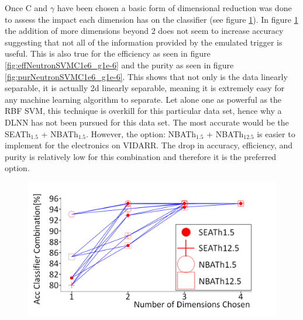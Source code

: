 Once C and $\gamma$ have been chosen a basic form of dimensional reduction was done to assess the impact each dimension has on the classifier (see figure \ref{fig:accNeutronSVMC1e6_g1e-6}). In figure \ref{fig:accNeutronSVMC1e6_g1e-6} the addition of more dimensions beyond 2 does not seem to increase accuracy suggesting that not all of the information provided by the emulated trigger is useful. This is also true for the efficiency as seen in figure \ref{fig:effNeutronSVMC1e6_g1e-6} and the purity as seen in figure \ref{fig:purNeutronSVMC1e6_g1e-6}. This shows that not only is the data linearly separable, it is actually 2d linearly separable, meaning it is extremely easy for any machine learning algorithm to separate. Let alone one as powerful as the RBF SVM, this technique is overkill for this particular data set, hence why a DLNN has not been pursued for this data set. The most accurate would be the SEATh$_{1.5}$ + NBATh$_{1.5}$. However, the option: NBATh$_{1.5}$ + NBATh$_{12.5}$ is easier to implement for the electronics on VIDARR. The drop in accuracy, efficiency, and purity is relatively low for this combination and therefore it is the preferred option. 

\begin{figure}[!h]
\centering
\includegraphics[width=0.8\linewidth]{Chapter4/Figs/Raster/accNeutronSVMC1e6_g1e-6MedText.png}
\label{fig:accNeutronSVMC1e6_g1e-6}
\end{figure}

